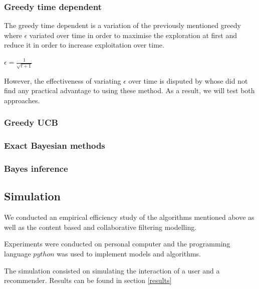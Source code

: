\documentclass[letterpaper]{article}
\begin{document}
\subsubsection{Greedy time dependent}

The greedy time dependent is a variation of the previously mentioned greedy where $\epsilon$ variated over time in order to maximise the exploration at first and reduce it in order to increase exploitation over time.

\begin{center}
	$\epsilon = \frac{1}{\sqrt{t+1}}$
\end{center}

However, the effectiveness of variating $\epsilon$ over time is disputed by \cite{vermorel2005multi} whose did not find any practical advantage to using these method. As a result, we will test both approaches.

\subsubsection{Greedy UCB}


\subsubsection{Exact Bayesian methods}


\subsubsection{Bayes inference}


\subsection{Simulation}

We conducted an empirical efficiency study of the algorithms mentioned above as well as the content based and collaborative filtering modelling. 

Experiments were conducted on personal computer and the programming language $python$ was used to implement models and algorithms.

The simulation consisted on simulating the interaction of a user and a recommender. Results can be found in section \ref{results} 
\end{document}
